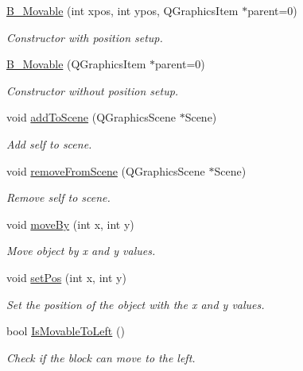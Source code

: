 \begin{DoxyCompactItemize}
\item 
\hyperlink{class_b___movable_ac874fc12d19502117d0bfc396d1059d2}{B\+\_\+\+Movable} (int xpos, int ypos, Q\+Graphics\+Item $\ast$parent=0)
\begin{DoxyCompactList}\small\item\em Constructor with position setup. \end{DoxyCompactList}\item 
\hyperlink{class_b___movable_aef88fa8933731c08731796a9ee3fda6b}{B\+\_\+\+Movable} (Q\+Graphics\+Item $\ast$parent=0)
\begin{DoxyCompactList}\small\item\em Constructor without position setup. \end{DoxyCompactList}\item 
void \hyperlink{class_b___movable_a8a23ac4b1692d95607dcccd6d6c9a973}{add\+To\+Scene} (Q\+Graphics\+Scene $\ast$Scene)
\begin{DoxyCompactList}\small\item\em Add self to scene. \end{DoxyCompactList}\item 
void \hyperlink{class_b___movable_aa4d26e877655021ef70bc6914fe04418}{remove\+From\+Scene} (Q\+Graphics\+Scene $\ast$Scene)
\begin{DoxyCompactList}\small\item\em Remove self to scene. \end{DoxyCompactList}\item 
void \hyperlink{class_b___movable_a55fb8069fc55c4edabd2ac076acdee17}{move\+By} (int x, int y)
\begin{DoxyCompactList}\small\item\em Move object by x and y values. \end{DoxyCompactList}\item 
void \hyperlink{class_b___movable_aca717ec608426940422f1bc658201bf5}{set\+Pos} (int x, int y)
\begin{DoxyCompactList}\small\item\em Set the position of the object with the x and y values. \end{DoxyCompactList}\item 
bool \hyperlink{class_b___movable_a96a0a18c27314600a19d467b6f7820a3}{Is\+Movable\+To\+Left} ()
\begin{DoxyCompactList}\small\item\em Check if the block can move to the left. \end{DoxyCompactList}\item 

\end{DoxyCompactItemize}
